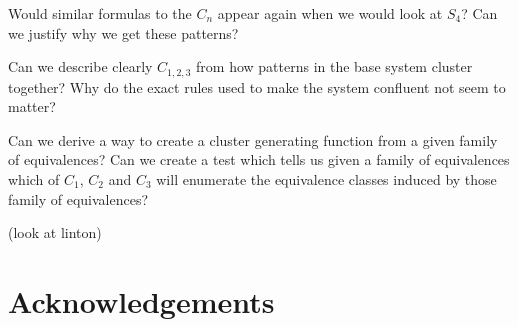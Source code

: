 \documentclass[a4paper, 11pt]{article}
\theoremstyle{definition}
\newcommand{\Sym}{S}
\begin{document}
Would similar formulas to the $C_n$ appear again when we would
look at $\Sym_4$? Can we justify why we get these patterns?

Can we describe clearly $C_{1,2,3}$ from how patterns in the base system cluster together?
Why do the exact rules used to make the system confluent not seem to matter?

Can we derive a way to create a cluster generating function from a given family
of equivalences? Can we create a test which tells us given a family of
equivalences which of $C_1$, $C_2$ and $C_3$ will enumerate the equivalence
classes induced by those family of equivalences?

(look at linton)

\section*{Acknowledgements}



\end{document}
